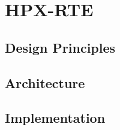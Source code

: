 \chapter{HPX-RTE}
\label{sec:HPX-RTE}

\section{Design Principles}
\label{sec:design}

\section{Architecture}
\label{sec:architecture}

\section{Implementation}
\label{sec:implementation}
